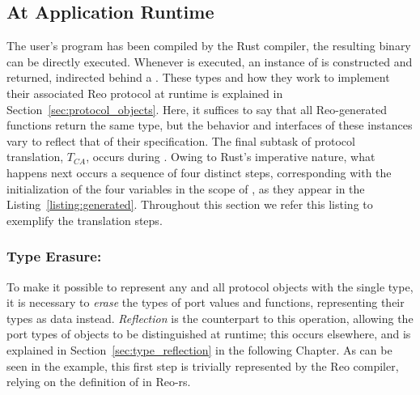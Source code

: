 
\subsection{At Application Runtime}
\label{sec:translation_phase_2}

The user's program has been compiled by the Rust compiler, the resulting binary can be directly executed. Whenever  is executed, an instance of  is constructed and returned, indirected behind a . These types and how they work to implement their associated Reo protocol at runtime is explained in Section~\ref{sec:protocol_objects}. Here, it suffices to say that all Reo-generated  functions return the same  type, but the behavior and interfaces of these instances vary to reflect that of their specification. The final subtask of protocol translation, $T_{CA}$, occurs during . Owing to Rust's imperative nature, what happens next occurs a sequence of four distinct steps, corresponding with the initialization of the four variables in the scope of , as they appear in the Listing~\ref{listing:generated}. Throughout this section we refer this listing to exemplify the translation steps.

\subsubsection{Type Erasure: }
To make it possible to represent any and all protocol objects with the single  type, it is necessary to \textit{erase} the types of port values and functions, representing their types as data instead. \textit{Reflection} is the counterpart to this operation, allowing the port types of  objects to be distinguished at runtime; this occurs elsewhere, and is explained in Section~\ref{sec:type_reflection} in the following Chapter. As can be seen in the example, this first step is trivially represented by the Reo compiler, relying on the definition of  in Reo-rs.

